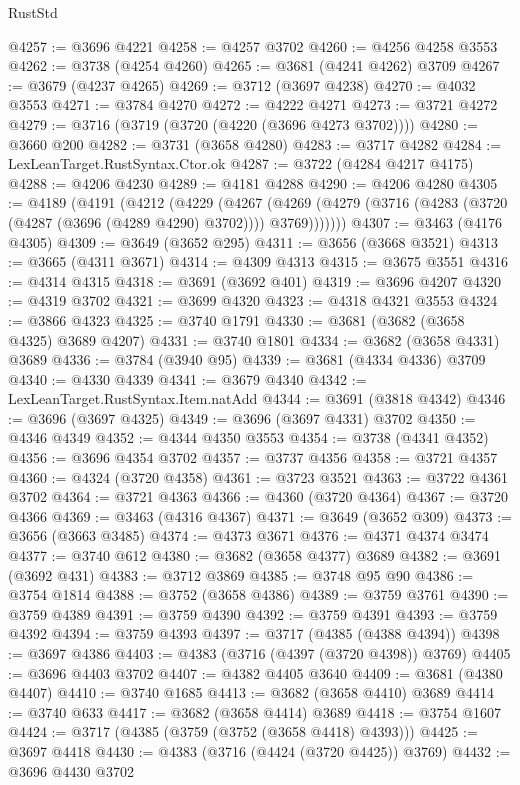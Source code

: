 \begin{lexlean}{RustStd}
\begin{coremodule}
@4257 := @3696 @4221
@4258 := @4257 @3702
@4260 := @4256 @4258 @3553
@4262 := @3738 (@4254 @4260)
@4265 := @3681 (@4241 @4262) @3709
@4267 := @3679 (@4237 @4265)
@4269 := @3712 (@3697 @4238)
@4270 := @4032 @3553
@4271 := @3784 @4270
@4272 := @4222 @4271
@4273 := @3721 @4272
@4279 := @3716 (@3719 (@3720 (@4220 (@3696 @4273 @3702))))
@4280 := @3660 @200
@4282 := @3731 (@3658 @4280)
@4283 := @3717 @4282
@4284 := LexLeanTarget.RustSyntax.Ctor.ok
@4287 := @3722 (@4284 @4217 @4175)
@4288 := @4206 @4230
@4289 := @4181 @4288
@4290 := @4206 @4280
@4305 := @4189
    (@4191
      (@4212
        (@4229
          (@4267
            (@4269 (@4279 (@3716 (@4283 (@3720 (@4287 (@3696 (@4289 @4290) @3702)))) @3769)))))))
@4307 := @3463 (@4176 @4305)
@4309 := @3649 (@3652 @295)
@4311 := @3656 (@3668 @3521)
@4313 := @3665 (@4311 @3671)
@4314 := @4309 @4313
@4315 := @3675 @3551
@4316 := @4314 @4315
@4318 := @3691 (@3692 @401)
@4319 := @3696 @4207
@4320 := @4319 @3702
@4321 := @3699 @4320
@4323 := @4318 @4321 @3553
@4324 := @3866 @4323
@4325 := @3740 @1791
@4330 := @3681 (@3682 (@3658 @4325) @3689 @4207)
@4331 := @3740 @1801
@4334 := @3682 (@3658 @4331) @3689
@4336 := @3784 (@3940 @95)
@4339 := @3681 (@4334 @4336) @3709
@4340 := @4330 @4339
@4341 := @3679 @4340
@4342 := LexLeanTarget.RustSyntax.Item.natAdd
@4344 := @3691 (@3818 @4342)
@4346 := @3696 (@3697 @4325)
@4349 := @3696 (@3697 @4331) @3702
@4350 := @4346 @4349
@4352 := @4344 @4350 @3553
@4354 := @3738 (@4341 @4352)
@4356 := @3696 @4354 @3702
@4357 := @3737 @4356
@4358 := @3721 @4357
@4360 := @4324 (@3720 @4358)
@4361 := @3723 @3521
@4363 := @3722 @4361 @3702
@4364 := @3721 @4363
@4366 := @4360 (@3720 @4364)
@4367 := @3720 @4366
@4369 := @3463 (@4316 @4367)
@4371 := @3649 (@3652 @309)
@4373 := @3656 (@3663 @3485)
@4374 := @4373 @3671
@4376 := @4371 @4374 @3474
@4377 := @3740 @612
@4380 := @3682 (@3658 @4377) @3689
@4382 := @3691 (@3692 @431)
@4383 := @3712 @3869
@4385 := @3748 @95 @90
@4386 := @3754 @1814
@4388 := @3752 (@3658 @4386)
@4389 := @3759 @3761
@4390 := @3759 @4389
@4391 := @3759 @4390
@4392 := @3759 @4391
@4393 := @3759 @4392
@4394 := @3759 @4393
@4397 := @3717 (@4385 (@4388 @4394))
@4398 := @3697 @4386
@4403 := @4383 (@3716 (@4397 (@3720 @4398)) @3769)
@4405 := @3696 @4403 @3702
@4407 := @4382 @4405 @3640
@4409 := @3681 (@4380 @4407)
@4410 := @3740 @1685
@4413 := @3682 (@3658 @4410) @3689
@4414 := @3740 @633
@4417 := @3682 (@3658 @4414) @3689
@4418 := @3754 @1607
@4424 := @3717 (@4385 (@3759 (@3752 (@3658 @4418) @4393)))
@4425 := @3697 @4418
@4430 := @4383 (@3716 (@4424 (@3720 @4425)) @3769)
@4432 := @3696 @4430 @3702

\end{coremodule}
\end{lexlean}

